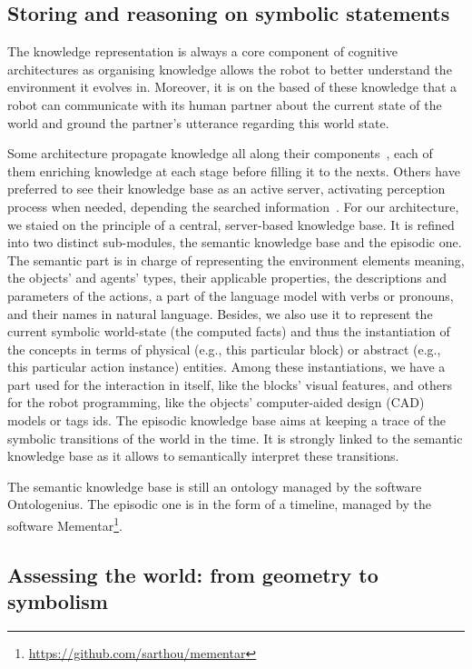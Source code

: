 \subsection{Storing and reasoning on symbolic statements}

The knowledge representation is always a core component of cognitive architectures as organising knowledge allows the robot to better understand the environment it evolves in. Moreover, it is on the based of these knowledge that a robot can communicate with its human partner about the current state of the world and ground the partner's utterance regarding this world state.

Some architecture propagate knowledge all along their components~\cite{hawes_2007_balt}, each of them enriching knowledge at each stage before filling it to the nexts. Others have preferred to see their knowledge base as an active server, activating perception process when needed, depending the searched information~\cite{beetz_2018_know}. For our architecture, we staied on the principle of a central, server-based knowledge base. It is refined into two distinct sub-modules, the semantic knowledge base and the episodic one. The semantic part is in charge of representing the environment elements meaning, the objects' and agents' types, their applicable properties, the descriptions and parameters of the actions, a part of the language model with verbs or pronouns, and their names in natural language. Besides, we also use it to represent the current symbolic world-state (the computed facts) and thus the instantiation of the concepts in terms of physical (e.g., this particular block) or abstract (e.g., this particular action instance) entities. Among these instantiations, we have a part used for the interaction in itself, like the blocks' visual features, and others for the robot programming, like the objects' computer-aided design (CAD) models or tags ids. The episodic knowledge base aims at keeping a trace of the symbolic transitions of the world in the time. It is strongly linked to the semantic knowledge base as it allows to semantically interpret these transitions. 

The semantic knowledge base is still an ontology managed by the software Ontologenius. The episodic one is in the form of a timeline, managed by the software Mementar\footnote{\url{https://github.com/sarthou/mementar}}.

\subsection{Assessing the world: from geometry to symbolism}

